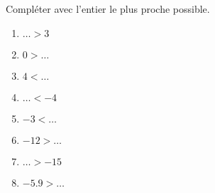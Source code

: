 
\begin{exercice}\label{exo2smath-0055}

    Compléter avec l'entier le plus proche possible.
    \begin{multicols}{2}
        \begin{enumerate}
            \item
                \( \ldots > 3\)
            \item
                \( 0>\ldots\)
            \item
                \( 4<\ldots\)
            \item
                \( \ldots < -4\)
            \item
                \( -3<\ldots\)
            \item
                \( -12>\ldots\)
            \item
                \( \ldots >-15\)
            \item
                \( -5.9>\ldots\)
        \end{enumerate}
    \end{multicols}
    

\end{exercice}
